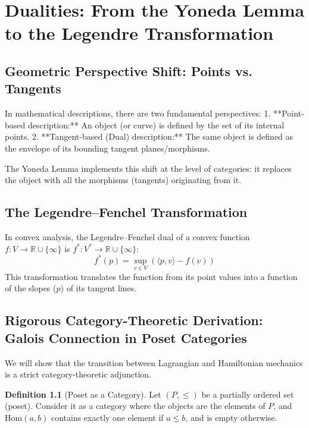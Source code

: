 \documentclass[11pt,a4paper,oneside]{book}
\theoremstyle{definition}
\newtheorem{definition}{Definition}[chapter]
\theoremstyle{plain}
\newcommand{\R}{\mathbb{R}}
\newcommand{\Hom}{\text{Hom}}
\begin{document}
\chapter{Dualities: From the Yoneda Lemma to the Legendre Transformation}

\section{Geometric Perspective Shift: Points vs. Tangents}
In mathematical descriptions, there are two fundamental perspectives:
1. **Point-based description:** An object (or curve) is defined by the set of its internal points.
2. **Tangent-based (Dual) description:** The same object is defined as the envelope of its bounding tangent planes/morphisms.

The Yoneda Lemma implements this shift at the level of categories: it replaces the object with all the morphisms (tangents) originating from it.

\section{The Legendre--Fenchel Transformation}
In convex analysis, the Legendre--Fenchel dual of a convex function $f: V \to \R \cup \{\infty\}$ is $f^*: V^* \to \R \cup \{\infty\}$:
\begin{equation}
f^*(p) = \sup_{v \in V} (\langle p, v \rangle - f(v))
\end{equation}
This transformation translates the function from its point values into a function of the slopes ($p$) of its tangent lines.

\section{Rigorous Category-Theoretic Derivation: Galois Connection in Poset Categories}
We will show that the transition between Lagrangian and Hamiltonian mechanics is a strict category-theoretic adjunction.

\begin{definition}[Poset as a Category]
Let $(P, \le)$ be a partially ordered set (poset). Consider it as a category where the objects are the elements of $P$, and $\Hom(a, b)$ contains exactly one element if $a \le b$, and is empty otherwise.
\end{definition}
\end{document}
